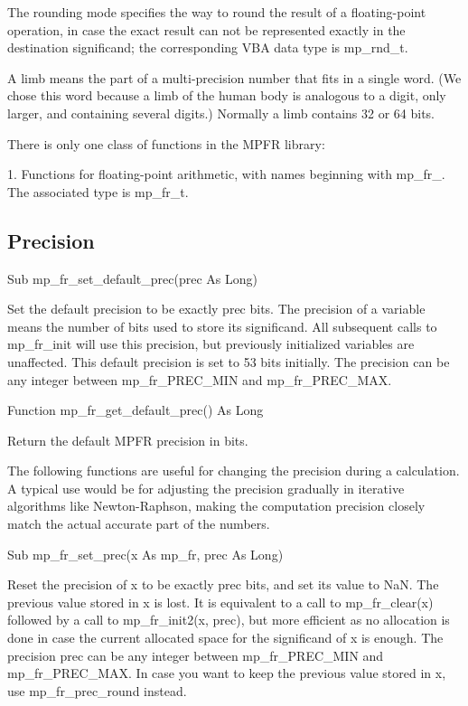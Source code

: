 \vspace{0.3cm}
The rounding mode specifies the way to round the result of a floating-point operation, in case the exact result can not be represented exactly in the destination significand; the corresponding VBA data type is mp\_rnd\_t. 

\vspace{0.3cm}
A limb means the part of a multi-precision number that fits in a single word. (We chose this word because a limb of the human body is analogous to a digit, only larger, and containing several digits.) Normally a limb contains 32 or 64 bits.

There is only one class of functions in the MPFR library: 

1. Functions for floating-point arithmetic, with names beginning with mp\_fr\_. The associated type is mp\_fr\_t. 



\subsection{Precision}

Sub mp\_fr\_set\_default\_prec(prec As Long) 

Set the default precision to be exactly prec bits. The precision of a variable means the number of bits used to store its significand. All subsequent calls to mp\_fr\_init will use this precision, but previously initialized variables are unaffected. This default precision is set to 53 bits initially. The precision can be any integer between mp\_fr\_PREC\_MIN and mp\_fr\_PREC\_MAX. 

\vspace{0.3cm}
Function mp\_fr\_get\_default\_prec() As Long 

Return the default MPFR precision in bits. 

\vspace{0.3cm}
The following functions are useful for changing the precision during a calculation. A typical use would be for adjusting the precision gradually in iterative algorithms like Newton-Raphson, making the computation precision closely match the actual accurate part of the numbers. 

\vspace{0.3cm}
Sub mp\_fr\_set\_prec(x As mp\_fr, prec As Long) 

Reset the precision of x to be exactly prec bits, and set its value to NaN. The previous value stored in x is lost. It is equivalent to a call to mp\_fr\_clear(x) followed by a call to mp\_fr\_init2(x, prec), but more efficient as no allocation is done in case the current allocated space for the significand of x is enough. The precision prec can be any integer between mp\_fr\_PREC\_MIN and mp\_fr\_PREC\_MAX. 
In case you want to keep the previous value stored in x, use mp\_fr\_prec\_round instead. 

